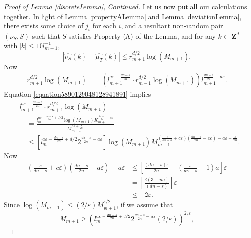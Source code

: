 \documentclass[12pt,reqno]{article}
\numberwithin{equation}{section}
\DeclareMathOperator{\ZZ}{\mathbf{Z}}
\begin{document}
\begin{proof}[Proof of Lemma \ref{discreteLemma}, Continued]
    Let us now put all our calculations together. In light of Lemma \ref{propertyALemma} and Lemma \ref{deviationLemma}, there exists some choice of $j_i$ for each $i$, and a resultant non-random pair $(\nu_S, S)$ such that $S$ satisfies Property (A) of the Lemma, and for any $k \in \ZZ^d$ with $|k| \leq 10 l_{m+1}^{-1}$,
    \begin{equation} \label{equation129419024129}
        |\widehat{\nu_{S}}(k) - \widehat{\mu_T}(k)| \leq r_{m+1}^{d/2} \log(M_{m+1}).
    \end{equation}
    Now
    \begin{align*}
        r_{m+1}^{d/2} \log(M_{m+1}) &= \left( l_{m+1}^{a\varepsilon - \frac{dn-s}{2n}} \cdot r_{m+1}^{d/2} \log(M_{m+1}) \right) l_{m+1}^{\frac{dn - s}{2n} - a \varepsilon}.
    \end{align*}
    Equation \eqref{equation5890129048128941891} implies
    \begin{align*}
        &l_{m+1}^{a\varepsilon - \frac{dn-s}{2n}} \cdot r_{m+1}^{d/2} \log(M_{m+1})\\
        &\ \ \ \ \ = \frac{l_m^{a\varepsilon - \frac{dn-s}{2n} + d/2} \log(M_{m+1}) K_{m+1}^{\frac{dn-s}{2n} - a\varepsilon}}{M_{m+1}^{a\varepsilon + \frac{s}{2n}}}\\
        &\ \ \ \ \ \leq \left[ l_m^{a\varepsilon - \frac{dn-s}{2n} + d/2} 2^{\frac{dn-s}{2n} - a \varepsilon} \right] \log(M_{m+1}) M_{m+1}^{\left( \frac{s}{dn-s} + c\varepsilon \right)\left(\frac{dn-s}{2n} - a\varepsilon\right) - a\varepsilon - \frac{s}{2n}}.
    \end{align*}
    Now
    \begin{align*}
        \left( \frac{s}{dn - s} + c\varepsilon \right) \left( \frac{dn - s}{2n} - a\varepsilon \right) - a\varepsilon &\leq \left[ \frac{(dn-s)c}{2n} - \left( \frac{s}{dn-s}+1 \right)a \right] \varepsilon\\
        &= \left[ \frac{d(3 - na)}{(dn - s)} \right] \varepsilon\\
        &\leq -2 \varepsilon.
    \end{align*}
    Since $\log(M_{m+1}) \leq (2/\varepsilon) M_{m+1}^{\varepsilon/2}$, if we assume that
    \begin{equation} \label{equation1290412904129049102}
        M_{m+1} \geq \left( l_m^{a\varepsilon - \frac{dn-s}{2n} + d/2} 2^{\frac{dn-s}{2n} - a\varepsilon} (2/\varepsilon) \right)^{2/\varepsilon},

\end{equation}
\end{proof}
\end{document}
